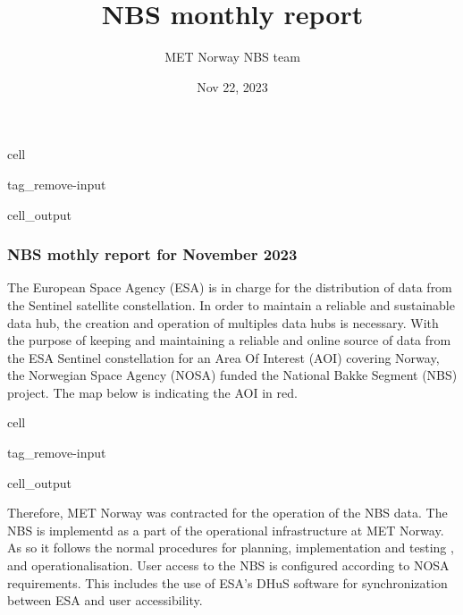 \documentclass[letterpaper,10pt,english]{jupyterBook}
\title{NBS monthly report}
\date{Nov 22, 2023}
\author{MET Norway \sphinxhyphen{} NBS team}
\begin{document}
\pagestyle{empty}
\sphinxmaketitle
\pagestyle{plain}
\sphinxtableofcontents
\pagestyle{normal}
\label{\detokenize{intro::doc}}
\begin{sphinxuseclass}{cell}
\begin{sphinxuseclass}{tag_remove-input}\begin{sphinxVerbatimOutput}

\begin{sphinxuseclass}{cell_output}\subsubsection*{NBS mothly report for November 2023}

\end{sphinxuseclass}\end{sphinxVerbatimOutput}

\end{sphinxuseclass}
\end{sphinxuseclass}


\begin{DUlineblock}{0em}
\item[] 
\end{DUlineblock}

\sphinxAtStartPar
The European Space Agency (ESA) is in charge for the distribution of data from the Sentinel satellite constellation. In order to maintain a reliable and sustainable data hub, the creation and operation of multiples data hubs is necessary. With the purpose of keeping and maintaining a reliable and online source of data from the ESA Sentinel constellation for an Area Of Interest (AOI) covering Norway, the Norwegian Space Agency (NOSA) funded the National Bakke Segment (NBS) project. The map below is indicating the AOI in red.

\begin{sphinxuseclass}{cell}
\begin{sphinxuseclass}{tag_remove-input}\begin{sphinxVerbatimOutput}

\begin{sphinxuseclass}{cell_output}
\noindent{}

\end{sphinxuseclass}\end{sphinxVerbatimOutput}

\end{sphinxuseclass}
\end{sphinxuseclass}
\sphinxAtStartPar
Therefore, MET Norway was contracted for the operation of the NBS data. The NBS is implementd as a part of the operational infrastructure at MET Norway. As so it follows the normal procedures for planning, implementation and testing , and operationalisation. User access to the NBS is configured according to NOSA requirements. This includes the use of ESA’s DHuS software for synchronization between ESA and user accessibility.
\end{document}
